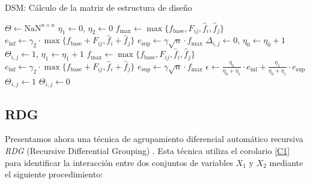 \begin{algorithm}[H]
\caption{DSM: Cálculo de la matriz de estructura de diseño}
\label{alg:DSM}
\begin{algorithmic}[1]
\STATE $\Theta \gets \text{NaN}^{n \times n}$
\STATE $\eta_1 \gets 0$, $\eta_2 \gets 0$
        \STATE $f_{\text{max}} \gets \max\{f_{\text{base}}, F_{ij}, \hat{f}_i, \hat{f}_j\}$
        \STATE $e_{\text{inf}} \gets \gamma_2 \cdot \max\{f_{\text{base}} + F_{ij}, \hat{f}_i + \hat{f}_j\}$
        \STATE $e_{\text{sup}} \gets \gamma \sqrt{n} \cdot f_{\text{max}}$
            \STATE $\Delta_{i,j} \gets 0$, $\eta_0 \gets \eta_0 + 1$
            \STATE $\Theta_{i,j} \gets 1$, $\eta_1 \gets \eta_1 + 1$
        \ENDIF
    \ENDFOR
\ENDFOR
{}
        \STATE $f_{\text{max}} \gets \max\{f_{\text{base}}, F_{ij}, \hat{f}_i, \hat{f}_j\}$
        \STATE $e_{\text{inf}} \gets \gamma_2 \cdot \max\{f_{\text{base}} + F_{ij}, \hat{f}_i + \hat{f}_j\}$
        \STATE $e_{\text{sup}} \gets \gamma \sqrt{n} \cdot f_{\text{max}}$
            \STATE $\epsilon \gets \frac{\eta_0}{\eta_0 + \eta_1} \cdot e_{\text{inf}} + \frac{\eta_1}{\eta_0 + \eta_1} \cdot e_{\text{sup}}$
                \STATE $\Theta_{i,j} \gets 1$
            \ELSE
                \STATE $\Theta_{i,j} \gets 0$
            \ENDIF
        \ENDIF
    \ENDFOR
\ENDFOR
\end{algorithmic}
\end{algorithm}

\subsection{RDG}
Presentamos ahora una técnica de agrupamiento diferencial automático recursiva \textit{RDG} (Recursive Differential Grouping) \cite{RDG}. Esta técnica utiliza el corolario \ref{C1} para identificar la interacción entre dos conjuntos de variables \(X_1\) y \(X_2\) mediante el siguiente procedimiento:

